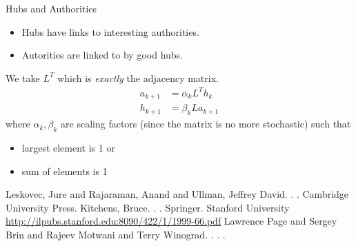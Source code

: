 \documentclass[10pt]{beamer}
\begin{document}
\begin{frame}{Hubs and Authorities}
  \begin{itemize}
    \item Hubs have links to interesting authorities.
    \item Autorities are linked to by good hubs.
  \end{itemize}
  We take $L^T$ which is \emph{exactly} the adjacency matrix.
  \begin{align*}
    a_{k+1} & = \alpha_k L^T h_k\\
    h_{k+1} & = \beta_k  L a_{k+1}
  \end{align*}
  where $\alpha_k, \beta_k$ are scaling factors (since the matrix is no more stochastic)
  such that
  \begin{itemize}
    \item largest element is 1 or
    \item sum of elements is 1
  \end{itemize}
\end{frame}

\begin{frame}
  \begin{thebibliography}{10}
      \beamertemplatebookbibitems
      Leskovec, Jure and Rajaraman, Anand and Ullman, Jeffrey David.
      .
      .
      \newblock Cambridge University Press.
      \beamertemplatearticlebibitems
        Kitchens, Bruce.
        .
        .
        \newblock Springer.        
        Stanford University
        \newblock  \url{http://ilpubs.stanford.edu:8090/422/1/1999-66.pdf}
      \beamertemplatearticlebibitems
        Lawrence Page and Sergey Brin and Rajeev Motwani and Terry Winograd.
        .
        .
        .
  \end{thebibliography}
\end{frame}
\end{document}

